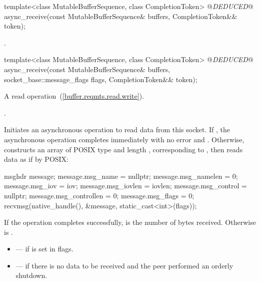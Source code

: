 \begin{itemdecl}
template<class MutableBufferSequence, class CompletionToken>
  @\textit{DEDUCED}@ async_receive(const MutableBufferSequence& buffers,
                        CompletionToken&& token);
\end{itemdecl}

\begin{itemdescr}
\pnum
\returns {}.
\end{itemdescr}

\begin{itemdecl}
template<class MutableBufferSequence, class CompletionToken>
  @\textit{DEDUCED}@ async_receive(const MutableBufferSequence& buffers,
                        socket_base::message_flags flags,
                        CompletionToken&& token);
\end{itemdecl}

\begin{itemdescr}
\pnum
A read operation~(\ref{buffer.reqmts.read.write}).

\pnum
\completionsig {}.

\pnum
\effects Initiates an asynchronous operation to read data from this socket. If , the asynchronous operation completes immediately with no error and . Otherwise, constructs an array  of POSIX type  and length , corresponding to , then reads data as if by POSIX: 
\begin{codeblock}
msghdr message;
message.msg_name = nullptr;
message.msg_namelen = 0;
message.msg_iov = iov;
message.msg_iovlen = iovlen;
message.msg_control = nullptr;
message.msg_controllen = 0;
message.msg_flags = 0;
recvmsg(native_handle(), &message, static_cast<int>(flags));
\end{codeblock}


\pnum
If the operation completes successfully,  is the number of bytes received. Otherwise  is .

\pnum
\errors
\begin{itemize}
\item
{} --- if  is set in flags.
\item
{} --- if there is no data to be received and the peer performed an orderly shutdown.
\end{itemize}
\end{itemdescr}

